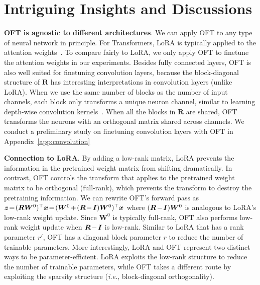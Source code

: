 \documentclass{article}
\newcommand{\ie}{\emph{i.e.}}
\begin{document}
\vspace{-1.75mm}
\section{Intriguing Insights and Discussions}
\vspace{-1.5mm}

\textbf{OFT is agnostic to different architectures}. We can apply OFT to any type of neural network in principle. For Transformers, LoRA is typically applied to the attention weights~\cite{hulora2022}. To compare fairly to LoRA, we only apply OFT to finetune the attention weights in our experiments. Besides fully connected layers, OFT is also well suited for finetuning convolution layers, because the block-diagonal structure of $\bm{R}$ has interesting interpretations in convolution layers (unlike LoRA). When we use the same number of blocks as the number of input channels, each block only transforms a unique neuron channel, similar to learning depth-wise convolution kernels~\cite{chollet2017xception}. When all the blocks in $\bm{R}$ are shared, OFT transforms the neurons with an orthogonal matrix shared across channels. We conduct a preliminary study on finetuning convolution layers with OFT in Appendix~\ref{app:convolution}

\vspace{-0.4mm}

\textbf{Connection to LoRA}. By adding a low-rank matrix, LoRA prevents the information in the pretrained weight matrix from shifting dramatically. In contrast, OFT controls the transform that applies to the pretrained weight matrix to be orthogonal (full-rank), which prevents the transform to destroy the pretraining information. We can rewrite OFT's forward pass as $\thickmuskip=2mu \medmuskip=2mu \bm{z}=(\bm{R}\bm{W}^0)^\top\bm{x}=(\bm{W}^0+(\bm{R}-\bm{I})\bm{W}^0)^\top\bm{x}$ where $\thickmuskip=2mu \medmuskip=2mu (\bm{R}-\bm{I})\bm{W}^0$ is analogous to LoRA's low-rank weight update. Since $\bm{W}^0$ is typically full-rank, OFT also performs low-rank weight update when $\thickmuskip=2mu \medmuskip=2mu \bm{R}-\bm{I}$ is low-rank. Similar to LoRA that has a rank parameter $r'$, OFT has a diagonal block parameter $r$ to reduce the number of trainable parameters. More interestingly, LoRA and OFT represent two distinct ways to be parameter-efficient. LoRA exploits the low-rank structure to reduce the number of trainable parameters, while OFT takes a different route by exploiting the sparsity structure (\ie, block-diagonal orthogonality).
\end{document}
